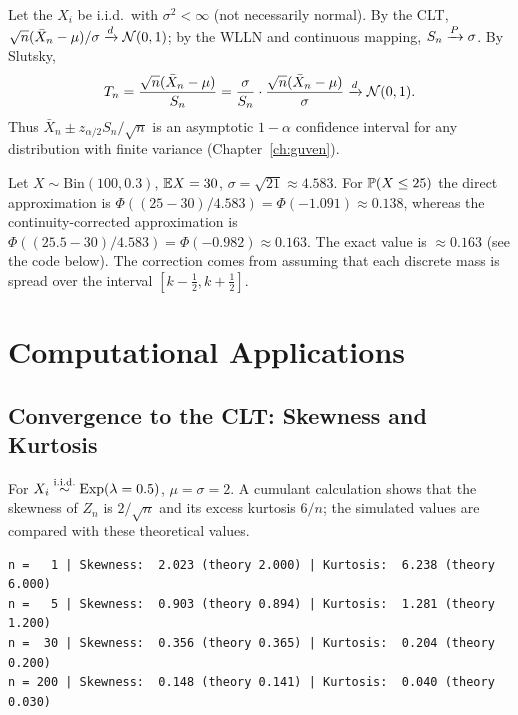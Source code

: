 \documentclass[main.tex]{subfiles}
\begin{document}
\begin{example}\label{ex:studentlestirme}
Let the $X_i$ be i.i.d.\ with $\sigma^2<\infty$ (not necessarily normal). By the CLT, $\sqrt n(\bar X_n-\mu)/\sigma\dto\Normal(0,1)$; by the WLLN and continuous mapping, $S_n\pto\sigma$. By Slutsky,
\[
T_n=\frac{\sqrt n(\bar X_n-\mu)}{S_n}=\frac{\sigma}{S_n}\cdot\frac{\sqrt n(\bar X_n-\mu)}{\sigma}\dto\Normal(0,1).
\]
Thus $\bar X_n\pm z_{\alpha/2}S_n/\sqrt n$ is an asymptotic $1-\alpha$ confidence interval for any distribution with finite variance (Chapter~\ref{ch:guven}).
\end{example}

\begin{example}\label{ex:sureklilik-duzeltmesi}
Let $X\sim\text{Bin}(100,0.3)$, $\E X=30$, $\sigma=\sqrt{21}\approx4.583$. For $\P(X\le25)$ the direct approximation is $\Phi((25-30)/4.583)=\Phi(-1.091)\approx0.138$, whereas the continuity-corrected approximation is $\Phi((25.5-30)/4.583)=\Phi(-0.982)\approx0.163$. The exact value is $\approx0.163$ (see the code below). The correction comes from assuming that each discrete mass is spread over the interval $[k-\frac12,k+\frac12]$.
\end{example}

\section{Computational Applications}

\subsection{Convergence to the CLT: Skewness and Kurtosis}
For $X_i\iid\text{Exp}(\lambda=0.5)$, $\mu=\sigma=2$. A cumulant calculation shows that the skewness of $Z_n$ is $2/\sqrt n$ and its excess kurtosis $6/n$; the simulated values are compared with these theoretical values.

\begin{lstlisting}[style=output]
n =   1 | Skewness:  2.023 (theory 2.000) | Kurtosis:  6.238 (theory 6.000)
n =   5 | Skewness:  0.903 (theory 0.894) | Kurtosis:  1.281 (theory 1.200)
n =  30 | Skewness:  0.356 (theory 0.365) | Kurtosis:  0.204 (theory 0.200)
n = 200 | Skewness:  0.148 (theory 0.141) | Kurtosis:  0.040 (theory 0.030)
\end{lstlisting}
\end{document}
